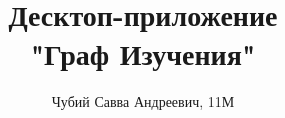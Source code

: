 \title[Граф Изучения]{Десктоп-приложение\\"Граф Изучения"}
\author[Чубий Савва]{Чубий Савва Андреевич, 11М}
\date{}

\maketitle
